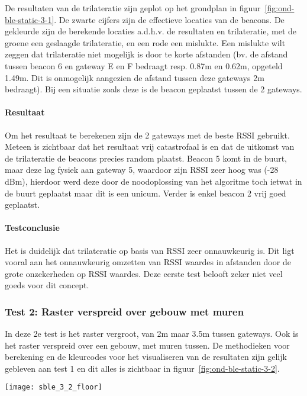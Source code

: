 De resultaten van de trilateratie zijn geplot op het grondplan in figuur~\ref{fig:ond-ble-static-3-1}. De zwarte cijfers zijn de effectieve locaties van de beacons. De gekleurde zijn de berekende locaties a.d.h.v. de resultaten en trilateratie, met de groene een geslaagde trilateratie, en een rode een mislukte. Een mislukte wilt zeggen dat trilateratie niet mogelijk is door te korte afstanden (bv. de afstand tussen beacon 6 en gateway E en F bedraagt resp. 0.87m en 0.62m, opgeteld 1.49m. Dit is onmogelijk aangezien de afstand tussen deze gateways 2m bedraagt). Bij een situatie zoals deze is de beacon geplaatst tussen de 2 gateways.

\paragraph{Resultaat}
Om het resultaat te berekenen zijn de 2 gateways met de beste RSSI gebruikt. Meteen is zichtbaar dat het resultaat vrij catastrofaal is en dat de uitkomst van de trilateratie de beacons precies random plaatst. Beacon 5 komt in de buurt, maar deze lag fysiek aan gateway 5, waardoor zijn RSSI zeer hoog was (-28 dBm), hierdoor werd deze door de noodoplossing van het algoritme toch ietwat in de buurt geplaatst maar dit is een unicum. Verder is enkel beacon 2 vrij goed geplaatst.

\paragraph{Testconclusie}
Het is duidelijk dat trilateratie op basis van RSSI zeer onnauwkeurig is. Dit ligt vooral aan het onnauwkeurig omzetten van RSSI waardes in afstanden door de grote onzekerheden op RSSI waardes. Deze eerste test belooft zeker niet veel goeds voor dit concept.

\subsubsection{Test 2: Raster verspreid over gebouw met muren}
\label{sec:ond-ble-3-2}
\begin{minipage}{0.55\textwidth}
In deze 2e test is het raster vergroot, van 2m maar 3.5m tussen gateways. Ook is het raster verspreid over een gebouw, met muren tussen. De methodieken voor berekening en de kleurcodes voor het visualiseren van de resultaten zijn gelijk gebleven aan test 1 en dit alles is zichtbaar in figuur~\ref{fig:ond-ble-static-3-2}.
\end{minipage}
\hfill
\begin{minipage}{0.42\textwidth}
	\texttt{[image: sble\_3\_2\_floor]}
	\label{fig:ond-ble-static-3-2-ops}
\end{minipage}

